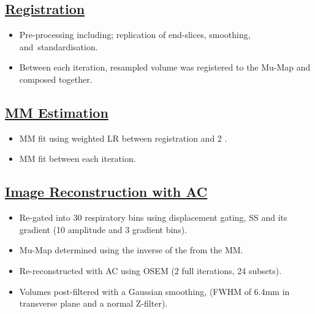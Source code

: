 \documentclass[portrait, color=UCLburgundy, margin=1cm]{uclposter}
\begin{document}
\begin{multicols}{2}
            \subsection*{\underline{\textbf{Registration}}}
                \begin{itemize}
                    \item Pre-processing including; replication of end-slices, smoothing, and\newline~standardisation.
                    \item Between each iteration, resampled volume was registered to the \acrshort{Mu-Map} and  composed together.
                \end{itemize}
            
            \subsection*{\underline{\textbf{\acrlong{MM} Estimation}}}
                \begin{itemize}
                    \item \gls{MM} fit using weighted \acrlong{LR} between registration  and 2 .
                    \item \gls{MM} fit between each iteration.
                \end{itemize}
            
            \subsection*{\underline{\textbf{Image Reconstruction with \acrshort{AC}}}}
                \begin{itemize}
                    \item Re-gated into 30 respiratory bins using displacement gating, \gls{SS} and its gradient (10 amplitude and 3 gradient bins).
                    \item \acrshort{Mu-Map} determined using the inverse of the  from the \gls{MM}.
                    \item Re-reconstructed with \acrshort{AC} using \acrshort{OSEM} (2 full iterations, 24 subsets).
                    \item Volumes post-filtered with a Gaussian smoothing, (\acrshort{FWHM} of 6.4mm in transverse plane and a normal Z-filter).
                \end{itemize}
        
        \begin{figure}[H]
            \centering
            

\end{figure}
\end{multicols}
\end{document}
